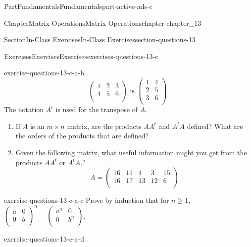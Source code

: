 \documentclass[oneside,10pt,]{book}
\numberwithin{equation}{section}
\begin{document}
\begin{partptx}{Part}{Fundamentals}{}{Fundamentals}{}{}{part-active-ads-c}
\begin{chapterptx}{Chapter}{Matrix Operations}{}{Matrix Operations}{}{}{chapter-chapter_13}
\begin{sectionptx}{Section}{In-Class Exercises}{}{In-Class Exercises}{}{}{section-questions-13}
\begin{exercises-subsection-numberless}{Exercises}{Exercises}{}{Exercises}{}{}{exercises-questions-13-c}
\begin{exercisegroup}
\begin{divisionexerciseeg}{2}{}{}{exercise-questions-13-c-a-b}
\begin{equation*}
\left(
\begin{array}{ccc}
1 &2 &3 \\
4 &5 &6 \\
\end{array}
\right) \textrm{  is  }
\left(
\begin{array}{cc}
1 &4 \\
2 &5 \\
3 &6 \\
\end{array}
\right).
\end{equation*}
The notation \(A^t\) is used for the transpose of \(A\).%
\begin{enumerate}[label=(\alph*)]
\item{}If \(A\) is an \(m \times n\) matrix, are the products \(A A^t\) and \(A^t A \) defined?  What are the orders of the products that are defined?%
\item{}Given the following matrix, what useful information might you get from the products \(A A^t\) or \(A^t A\).?%
\begin{equation*}
A=\left(
\begin{array}{ccccc}
16 &11 &4 &3 &15 \\
16 &17 &13 &12 &6 \\
\end{array}
\right) 
\end{equation*}
%
\end{enumerate}
%
\end{divisionexerciseeg}%
\begin{divisionexerciseeg}{3}{}{}{exercise-questions-13-c-a-c}%
Prove by induction that for \(n \geq 1\), \(\left(
\begin{array}{cc}
a & 0 \\
0 & b \\
\end{array}
\right)^n= \left(
\begin{array}{cc}
a^n & 0 \\
0 & b^n \\
\end{array}
\right)\).%
\end{divisionexerciseeg}%
\begin{divisionexerciseeg}{4}{}{}{exercise-questions-13-c-a-d}%

\end{divisionexerciseeg}
\end{exercisegroup}
\end{exercises-subsection-numberless}
\end{sectionptx}
\end{chapterptx}
\end{partptx}
\end{document}
